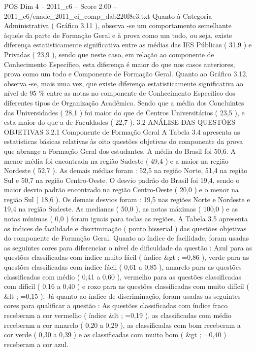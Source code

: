 \begin{textsample}{POS Dim 4 – 2011\_c6 – Score 2.00 – 2011\_c6/enade\_2011\_ci\_comp\_dab220f8e3.txt}
Quanto à Categoria Administrativa ( Gráfico 3.11 ), observa -se um comportamento semelhante àquele da parte de Formação Geral e à prova como um todo, ou seja, existe diferença estatisticamente significativa entre as médias das IES Públicas ( 31,9 ) e Privadas ( 23,9 ), sendo que neste caso, em relação ao componente de Conhecimento Específico, esta diferença é maior do que nos casos anteriores, prova como um todo e Componente de Formação Geral.
Quanto ao Gráfico 3.12, observa -se, mais uma vez, que existe diferença estatisticamente significativa ao nível de 95 \% entre as notas no componente de Conhecimento Específico dos diferentes tipos de Organização Acadêmica.
Sendo que a média dos Concluintes das Universidades ( 28,1 ) foi maior do que de Centros Universitários ( 23,5 ), e esta maior do que a de Faculdades ( 22,7 ). 3.2 ANÁLISE DAS QUESTÕES OBJETIVAS 3.2.1 Componente de Formação Geral A Tabela 3.4 apresenta as estatísticas básicas relativas às oito questões objetivas do componente da prova que abrange a Formação Geral dos estudantes.
A média do Brasil foi 50,6.
A menor média foi encontrada na região Sudeste ( 49,4 ) e a maior na região Nordeste ( 52,7 ).
As demais médias foram : 52,5 na região Norte, 51,4 na região Sul e 50,7 na região Centro-Oeste.
O desvio padrão do Brasil foi 19,4, sendo o maior desvio padrão encontrado na região Centro-Oeste ( 20,0 ) e o menor na região Sul ( 18,6 ).
Os demais desvios foram : 19,5 nas regiões Norte e Nordeste e 19,4 na região Sudeste.
As medianas ( 50,0 ), as notas máximas ( 100,0 ) e as notas mínimas ( 0,0 ) foram iguais para todas as regiões.
A Tabela 3.5 apresenta os índices de facilidade e discriminação ( ponto bisserial ) das questões objetivas do componente de Formação Geral.
Quanto ao índice de facilidade, foram usadas as seguintes cores para diferenciar o nível de dificuldade da questão : Azul para as questões classificadas com índice muito fácil ( índice \&gt ; =0,86 ), verde para as questões classificadas com índice fácil ( 0,61 a 0,85 ), amarelo para as questões classificadas com médio ( 0,41 a 0,60 ), vermelho para as questões classificadas com difícil ( 0,16 a 0,40 ) e roxo para as questões classificadas com muito difícil ( \&lt ; =0,15 ).
Já quanto ao índice de discriminação, foram usadas as seguintes cores para qualificar a questão : As questões classificadas com índice fraco receberam a cor vermelho ( índice \&lt ; =0,19 ), as classificadas com médio receberam a cor amarelo ( 0,20 a 0,29 ), as classificadas com bom receberam a cor verde ( 0,30 a 0,39 ) e as classificadas com muito bom ( \&gt ; =0,40 ) receberam a cor azul.

\end{textsample}
